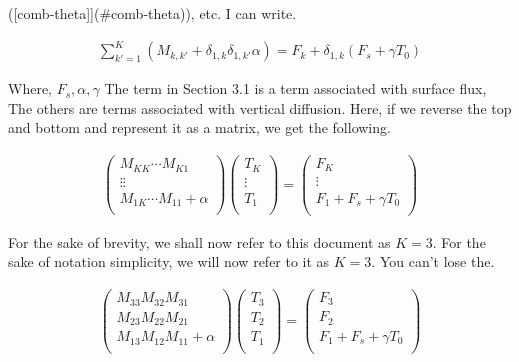 ({[}comb-theta{]}{]}(\#comb-theta)), etc. I can write.

\begin{eqnarray}
  \sum_{k'=1}^{K} ( M_{k,k'} + \delta_{1,k} \delta_{1,k'} \alpha)
    = F_k + \delta_{1,k} ( F_s + \gamma T_0 )
\end{eqnarray}

Where, \(F_s, \alpha, \gamma\) The term in Section 3.1 is a term
associated with surface flux, The others are terms associated with
vertical diffusion. Here, if we reverse the top and bottom and represent
it as a matrix, we get the following.

\begin{eqnarray}
  \left( \begin{array}{lll} M_{KK}  \cdots  M_{K1} \\ \vdots  
  \vdots \\ M_{1K}  \cdots  M_{11} + \alpha \\
\end{array}  \right)
\left( \begin{array}{l} T_K \\ \vdots \\ T_1 \\
\end{array}  \right)
= \left( \begin{array}{l} F_K \\ \vdots \\ F_1 + F_s + \gamma T_{0} \\
\end{array} \right)
\end{eqnarray}

For the sake of brevity, we shall now refer to this document as \(K=3\).
For the sake of notation simplicity, we will now refer to it as \(K=3\).
You can't lose the.

\begin{eqnarray}
  \left( \begin{array}{lll} M_{33}  M_{32}  M_{31} \\ M_{23}
  M_{22}  M_{21} \\ M_{13}  M_{12}  M_{11} + \alpha \\
\end{array} \right)
\left( \begin{array}{l} T_3 \\ T_2 \\ T_1 \\
\end{array} \right)
= \left( \begin{array}{l} F_3 \\ F_2 \\ F_1 + F_s + \gamma T_{0} \\
\end{array} \right)
\end{eqnarray}


